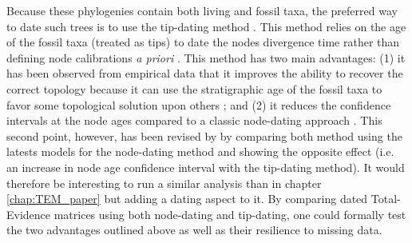 Because these phylogenies contain both living and fossil taxa, the preferred way to date such trees is to use the tip-dating method \citep[e.g.][]{ronquista2012,Wood01032013,Dembo2015}.
This method relies on the age of the fossil taxa (treated as tips) to date the nodes divergence time rather than defining node calibrations \textit{a priori} \citep[cf. node-dating;][]{ronquista2012}.
This method has two main advantages: (1) it has been observed from empirical data that it improves the ability to recover the correct topology because it can use the stratigraphic age of the fossil taxa to favor some topological solution upon others \citep[typically by minimizing implied ghost lineages;][and personal communications]{BEASTmaster}; and (2) it reduces the confidence intervals at the node ages compared to a classic node-dating approach \citep{ronquista2012}.
This second point, however, has been revised by \cite{Arcila2015131} by comparing both method using the latests models for the node-dating method \citep[i.e. using the fossilised birth-death model;][]{heaththe2013} and showing the opposite effect (i.e. an increase in node age confidence interval with the tip-dating method).
It would therefore be interesting to run a similar analysis than in chapter \ref{chap:TEM_paper} but adding a dating aspect to it.
By comparing dated Total-Evidence matrices using both node-dating and tip-dating, one could formally test the two advantages outlined above as well as their resilience to missing data.

